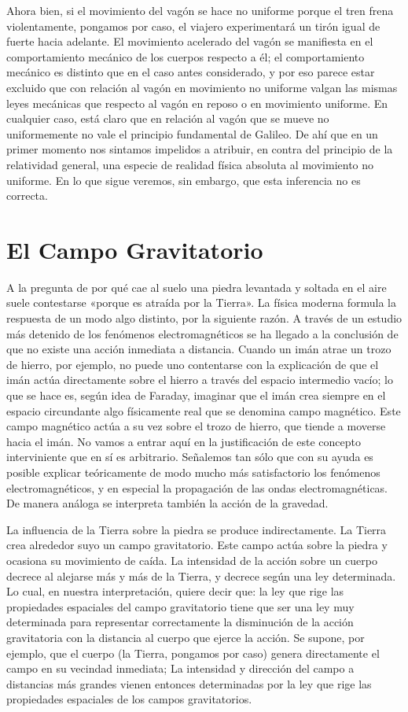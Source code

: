 \documentclass[spanish]{book}
\begin{document}
Ahora bien, si el movimiento del vagón se hace no uniforme porque el tren frena
violentamente, pongamos por caso, el viajero experimentará un tirón igual de fuerte
hacia adelante. El movimiento acelerado del vagón se manifiesta en el comportamiento
mecánico de los cuerpos respecto a él; el comportamiento mecánico es distinto que en
el caso antes considerado, y por eso parece estar excluido que con relación al vagón en
movimiento no uniforme valgan las mismas leyes mecánicas que respecto al vagón en
reposo o en movimiento uniforme. En cualquier caso, está claro que en relación al
vagón que se mueve no uniformemente no vale el principio fundamental de Galileo.
De ahí que en un primer momento nos sintamos impelidos a atribuir, en contra del
principio de la relatividad general, una especie de realidad física absoluta al
movimiento no uniforme. En lo que sigue veremos, sin embargo, que esta inferencia
no es correcta.


\chapter{El Campo Gravitatorio}

A la pregunta de por qué cae al suelo una piedra levantada y soltada en el aire suele
contestarse «porque es atraída por la Tierra». La física moderna formula la respuesta
de un modo algo distinto, por la siguiente razón. A través de un estudio más detenido
de los fenómenos electromagnéticos se ha llegado a la conclusión de que no existe una
acción inmediata a distancia. Cuando un imán atrae un trozo de hierro, por ejemplo,
no puede uno contentarse con la explicación de que el imán actúa directamente sobre
el hierro a través del espacio intermedio vacío; lo que se hace es, según idea de
Faraday, imaginar que el imán crea siempre en el espacio circundante algo físicamente
real que se denomina campo magnético. Este campo magnético actúa a su vez sobre
el trozo de hierro, que tiende a moverse hacia el imán. No vamos a entrar aquí en la
justificación de este concepto interviniente que en sí es arbitrario. Señalemos tan sólo
que con su ayuda es posible explicar teóricamente de modo mucho más satisfactorio
los fenómenos electromagnéticos, y en especial la propagación de las ondas
electromagnéticas. De manera análoga se interpreta también la acción de la gravedad.

La influencia de la Tierra sobre la piedra se produce indirectamente. La Tierra
crea alrededor suyo un campo gravitatorio. Este campo actúa sobre la piedra y
ocasiona su movimiento de caída. La intensidad de la acción sobre un cuerpo decrece
al alejarse más y más de la Tierra, y decrece según una ley determinada. Lo cual, en
nuestra interpretación, quiere decir que: la ley que rige las propiedades espaciales del
campo gravitatorio tiene que ser una ley muy determinada para representar
correctamente la disminución de la acción gravitatoria con la distancia al cuerpo que
ejerce la acción. Se supone, por ejemplo, que el cuerpo (la Tierra, pongamos por caso)
genera directamente el campo en su vecindad inmediata; La intensidad y dirección del
campo a distancias más grandes vienen entonces determinadas por la ley que rige las
propiedades espaciales de los campos gravitatorios.
\end{document}
